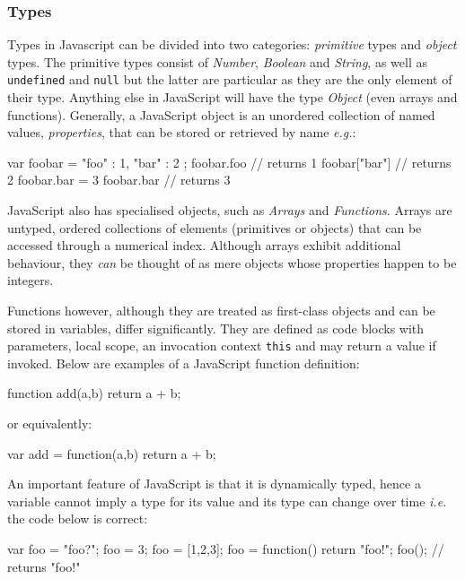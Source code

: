 \subsubsection{Types}
Types in Javascript can be divided into two categories: \emph{primitive} types and \emph{object} types. The primitive types consist of \emph{Number}, \emph{Boolean} and \emph{String}, as well as \texttt{undefined} and \texttt{null} but the latter are particular as they are the only element of their type. Anything else in JavaScript will have the type \emph{Object} (even arrays and functions). Generally, a JavaScript object is an unordered collection of named values, \emph{properties}, that can be stored or retrieved by name \emph{e.g.}:

\begin{code}
var foobar = { "foo" : 1,
               "bar" : 2 };
foobar.foo     // returns 1
foobar["bar"]  // returns 2
foobar.bar = 3
foobar.bar     // returns 3
\end{code}

JavaScript also has specialised objects, such as \emph{Arrays} and \emph{Functions}. Arrays are untyped, ordered collections of elements (primitives or objects) that can be accessed through a numerical index. Although arrays exhibit additional behaviour, they \emph{can} be thought of as mere objects whose properties happen to be integers.

Functions however, although they are treated as first-class objects and can be stored in variables, differ significantly. They are defined as code blocks with parameters, local scope, an invocation context \texttt{this} and may return a value if invoked. Below are examples of a JavaScript function definition:

\begin{code}
function add(a,b) {
    return a + b;
}
\end{code}
\newline or equivalently:

\begin{code}
var add = function(a,b) {
    return a + b;
}
\end{code}

An important feature of JavaScript is that it is dynamically typed, hence a variable cannot imply a type for its value and its type can change over time \emph{i.e.} the code below is correct:

\begin{code}
var foo = "foo?";
foo = 3;
foo = [1,2,3];
foo = function() {return "foo!"};
foo(); // returns "foo!"
\end{code}

